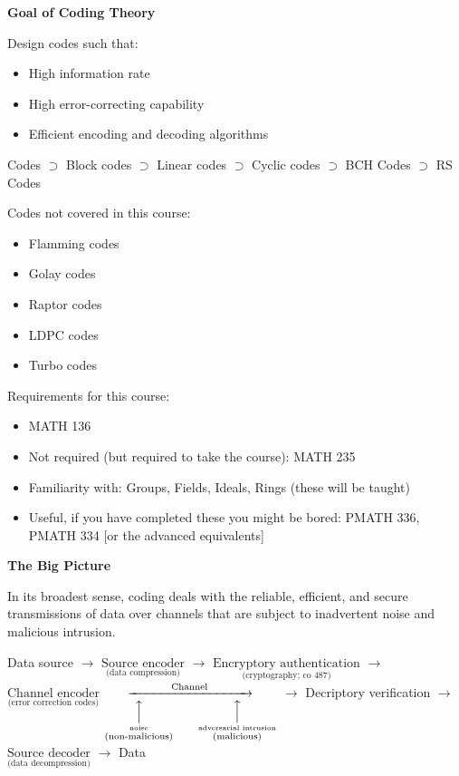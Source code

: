 \textbf{Goal of Coding Theory}

Design codes such that:
\begin{itemize}
    \item High information rate
    \item High error-correcting capability
    \item Efficient encoding and decoding algorithms
\end{itemize}

Codes $ \supset $ Block codes $ \supset $  Linear codes
$ \supset $  Cyclic codes $ \supset $ BCH Codes
$ \supset $ RS Codes

Codes not covered in this course:
\begin{itemize}
    \item Flamming codes
    \item Golay codes
    \item Raptor codes
    \item LDPC codes
    \item Turbo codes
\end{itemize}

Requirements for this course:
\begin{itemize}
    \item MATH 136
    \item Not required (but required to take the course): MATH 235
    \item Familiarity with: Groups, Fields, Ideals, Rings (these will be taught)
    \item Useful, if you have completed these you might be bored:
          PMATH 336, PMATH 334 [or the advanced equivalents]
\end{itemize}

\textbf{The Big Picture}

In its broadest sense, coding deals with the reliable, efficient, and secure
transmissions of data over channels that are subject to inadvertent noise and
malicious intrusion.

Data source
$ \rightarrow $
$ \underset{\text{(data compression)}}{\text{Source encoder}} $
$ \rightarrow $
$ \underset{\text{(cryptography; co 487)}}{\text{Encryptory authentication}} $
$ \rightarrow $
$ \underset{\text{(error correction codes)}}{\text{Channel encoder}} $
$ \underset
    {
        \overset{\Big\uparrow}{\overset{\text{noise}}{\text{(non-malicious)}}}\qquad
        \overset{\Big\uparrow}{\overset{\text{adversarial intrusion}}{\text{(malicious)}}}
    }
    {\xrightarrow{\text{\qquad\qquad Channel\qquad\qquad}}} $
$ \rightarrow $
Decriptory verification
$ \rightarrow $
$ \underset{\text{(data decompression)}}{\text{Source decoder}}  $
$ \rightarrow $
Data
